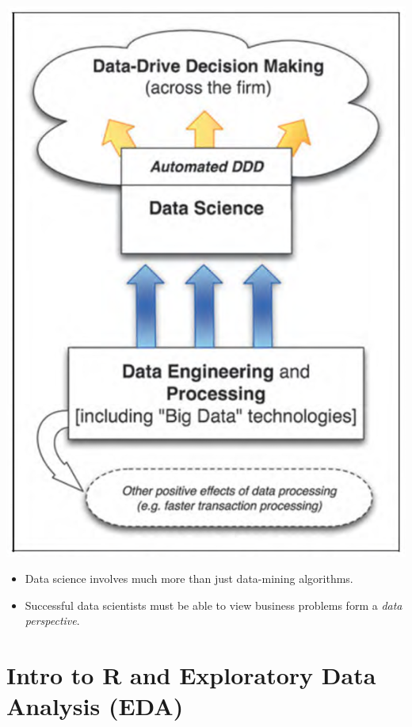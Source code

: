 \documentclass[a4paper]{article}
\begin{document}
			\begin{minipage}[c]{0.3\textwidth}
				\centering
				\includegraphics[width=\textwidth]{img/sw01/data_driven.png}
			\end{minipage}
			\hfill
			\begin{minipage}[c]{0.6\textwidth}
				\begin{itemize}
					\item Data science involves much more than just data-mining algorithms.
					\item Successful data scientists must be able to view business problems form a \textit{data perspective}.
				\end{itemize}
			\end{minipage}
		
			\newpage
		
	\section{Intro to R and Exploratory Data Analysis (EDA)}
	
\end{document}
